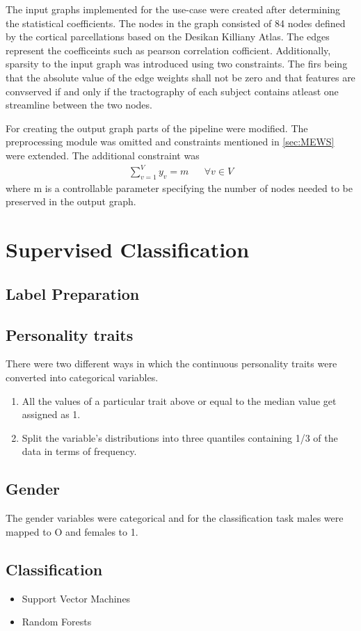 \documentclass[msthesis.tex]{subfiles}
\begin{document}
The input graphs implemented for the use-case were created after determining the statistical coefficients. The nodes in the graph consisted of 84 nodes defined by the cortical parcellations based on the Desikan Killiany Atlas. The edges represent the coefficeints such as pearson correlation cofficient. Additionally, sparsity to the input graph was introduced using two constraints. The firs being that the absolute value of the edge weights shall not be zero and that features are convserved if and only if the tractography of each subject contains atleast one streamline between the two nodes. 

For creating the output graph parts of the pipeline \cite{DBLP:journals/corr/LobodaAS16} were modified. The preprocessing module was omitted and constraints mentioned in \ref{sec:MEWS} were extended. The additional constraint was 
\begin{align}
    \label{eq:sum_constraints}
    \sum_{v=1}^{V} y_v = m        &&  \forall v \in V
\end{align}
where m is a controllable parameter specifying the number of nodes needed to be preserved in the output graph. 


\section{Supervised Classification}

\subsection{Label Preparation}
\label{sec:label_preparation}
\subsection{Personality traits}
There were two different ways in which the continuous personality traits were converted into categorical variables. 
\begin{enumerate}
    \item All the values of a particular trait above or equal to the median value get assigned as 1. 
    \item Split the variable's distributions into three quantiles containing 1/3 of the data in terms of frequency. 
\end{enumerate}

\subsection{Gender}
The gender variables were categorical and for the classification task males were mapped to O and females to 1. 

\subsection{Classification}
\begin{itemize}
    \item Support Vector Machines
    \item Random Forests

\end{itemize}
\end{document}
